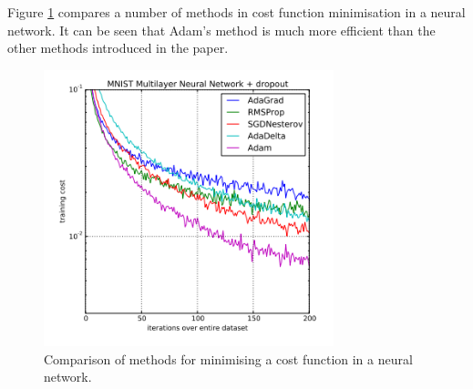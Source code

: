 \newpage
Figure \ref{comparison} compares a number of methods in cost function minimisation in a neural network. It can be seen that Adam's method is much more efficient than the other methods introduced in the paper.
\begin{figure}[h]
    \centering
    \includegraphics[width=0.75\textwidth]{images/Machine learning/Comparison.PNG}
    \caption{Comparison of methods for minimising a cost function in a neural network. \cite{kingma_adam_2017}}
    \label{comparison}
\end{figure}